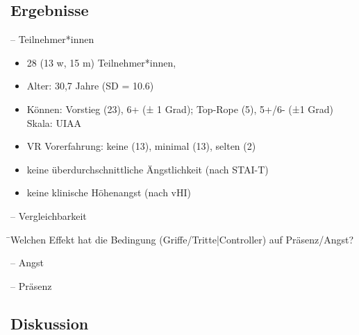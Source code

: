 \subsection{Ergebnisse}

\begin{frame}{\currentname{} -- Teilnehmer*innen}
	\begin{itemize}[label=\textcolor{tertiary}{}]
		\item 28 (13 w, 15 m) Teilnehmer*innen, 
		\item Alter: 30,7 Jahre (SD = 10.6)
		\item Können: Vorstieg (23), 6+ (± 1 Grad); Top-Rope (5), 5+/6- (±1 Grad) \textcolor{source}{Skala: UIAA}
		\item VR Vorerfahrung: keine (13), minimal (13), selten (2)
		\item keine überdurchschnittliche Ängstlichkeit (nach STAI-T)
		\item keine klinische Höhenangst (nach vHI)
	\end{itemize}
\end{frame}

\begin{frame}{\currentname{} -- Vergleichbarkeit}
	\begin{tabbing}
		\textcolor{primary}{} \quad \= \large Welchen Effekt hat die Bedingung (Griffe/Tritte|Controller) auf Präsenz/Angst?
	\end{tabbing}
	
\end{frame}

\begin{frame}{\currentname{} -- Angst}

\end{frame}

\begin{frame}{\currentname{} -- Präsenz}

\end{frame}

\subsection{Diskussion}

